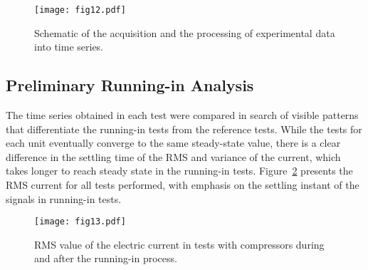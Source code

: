 \documentclass[preprint,11pt,number]{elsarticle}
\begin{document}
\begin{table}[htb]
\begin{center}
\end{center}
\end{table}

\begin{figure}[htb]
\begin{center}
\texttt{[image: fig12.pdf]}    %
\caption{Schematic of the acquisition and the processing of experimental data into time series.}
\label{fig:TimeSeriesProc}
\end{center}
\end{figure}

\subsection{Preliminary Running-in Analysis}\label{subsec:PreliminaryRunningInAnalysis}

The time series obtained in each test were compared in search of visible patterns that differentiate the running-in tests from the reference tests. While the tests for each unit eventually converge to the same steady-state value, there is a clear difference in the settling time of the RMS and variance of the current, which takes longer to reach steady state in the running-in tests. Figure~\ref{fig:RMSCurrentA} presents the RMS current for all tests performed, with emphasis on the settling instant of the signals in running-in tests.

\begin{figure}[htb]
\begin{center}
\texttt{[image: fig13.pdf]}    %
\caption{RMS value of the electric current in tests with compressors during and after the running-in process.} 
\label{fig:RMSCurrentA}
\end{center}
\end{figure}
\end{document}
